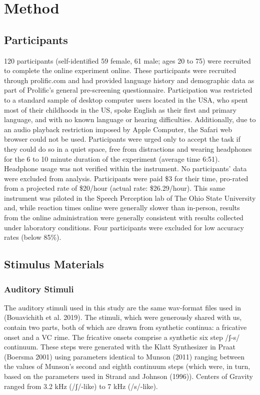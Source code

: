 \documentclass[
  letterpaper,
  DIV=11,
  numbers=noendperiod]{scrartcl}
\begin{document}
\section{Method}\label{method}

\subsection{Participants}\label{participants}

120 participants (self-identified 59 female, 61 male; ages 20 to 75)
were recruited to complete the online experiment online. These
participants were recruited through prolific.com and had provided
language history and demographic data as part of Prolific's general
pre-screening questionnaire. Participation was restricted to a standard
sample of desktop computer users located in the USA, who spent most of
their childhoods in the US, spoke English as their first and primary
language, and with no known language or hearing difficulties.
Additionally, due to an audio playback restriction imposed by Apple
Computer, the Safari web browser could not be used. Participants were
urged only to accept the task if they could do so in a quiet space, free
from distractions and wearing headphones for the 6 to 10 minute duration
of the experiment (average time 6:51). Headphone usage was not verified
within the instrument. No participants' data were excluded from
analysis. Participants were paid \$3 for their time, pro-rated from a
projected rate of \$20/hour (actual rate: \$26.29/hour). This same
instrument was piloted in the Speech Perception lab of The Ohio State
University and, while reaction times online were generally slower than
in-person, results from the online administration were generally
consistent with results collected under laboratory conditions. Four
participants were excluded for low accuracy rates (below 85\%).

\subsection{Stimulus Materials}\label{stimulus-materials}

\subsubsection{Auditory Stimuli}\label{auditory-stimuli}

The auditory stimuli used in this study are the same wav-format files
used in (Bouavichith et al. 2019). The stimuli, which were generously
shared with us, contain two parts, both of which are drawn from
synthetic continua: a fricative onset and a VC rime. The fricative
onsets comprise a synthetic six step /ʃ-s/ continuum. These steps were
generated with the Klatt Synthesizer in Praat (Boersma 2001) using
parameters identical to Munson (2011) ranging between the values of
Munson's second and eighth continuum steps (which were, in turn, based
on the parameters used in Strand and Johnson (1996)). Centers of Gravity
ranged from 3.2 kHz (/ʃ/-like) to 7 kHz (/s/-like).
\end{document}
